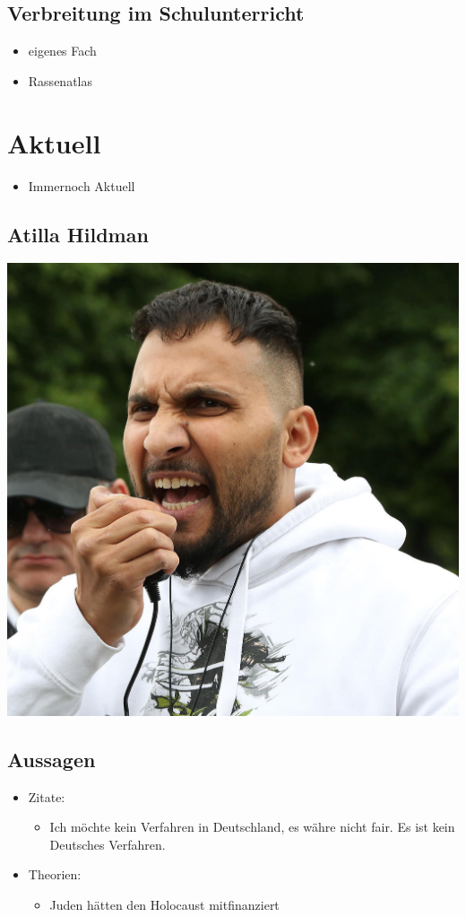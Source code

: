 \documentclass{article}
\begin{document}
\subsection{Verbreitung im Schulunterricht}
\label{sec:org0ec7116}
\begin{itemize}
\item eigenes Fach
\item Rassenatlas
\end{itemize}



\section{Aktuell}
\label{sec:org5a234e5}
\begin{itemize}
\item Immernoch Aktuell
\end{itemize}
\subsection{Atilla Hildman}
\label{sec:org63fc307}
\begin{center}
\includegraphics[width=.9\linewidth]{./atilla.jpg}
\end{center}
\subsection{Aussagen}
\label{sec:org63bb8ae}
\begin{itemize}
\item Zitate:
\begin{itemize}
\item Ich möchte kein Verfahren in Deutschland, es währe nicht fair. Es ist kein Deutsches Verfahren.
\end{itemize}
\item Theorien:
\begin{itemize}
\item Juden hätten den Holocaust mitfinanziert
\end{itemize}
\end{itemize}
\end{document}

